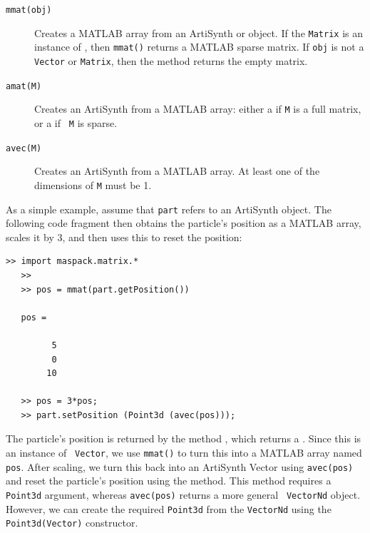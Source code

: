 \documentclass{article}
\begin{document}
\begin{description}

\item[{\tt mmat(obj)}]\mbox{}

Creates a MATLAB array from an ArtiSynth 
 or 
object. If the {\tt Matrix} is an instance of 
, then
{\tt mmat()} returns a MATLAB sparse matrix. If {\tt obj} is not a
{\tt Vector} or {\tt Matrix}, then the method returns the empty
matrix.

\item[{\tt amat(M)}]\mbox{}

Creates an ArtiSynth  from a MATLAB
array: either a  if {\tt M} is a
full matrix, or a  if {\tt
M} is sparse.

\item[{\tt avec(M)}]\mbox{}

Creates an ArtiSynth  from a
MATLAB array. At least one of the dimensions of {\tt M} must be 1.

\end{description}

As a simple example, assume that {\tt part} refers to an ArtiSynth
object. The following code fragment 
then obtains the particle's position as a MATLAB array,
scales it by 3, and then uses this to reset the position:
%
\begin{lstlisting}[]
   >> import maspack.matrix.*
   >> 
   >> pos = mmat(part.getPosition())

   pos =

         5
         0
        10

   >> pos = 3*pos;
   >> part.setPosition (Point3d (avec(pos)));
\end{lstlisting}
%
The particle's position is returned by the method 
,
which returns a . 
Since this is an instance of {\tt
Vector}, we use {\tt mmat()} to turn this into a MATLAB array named {\tt
pos}.  After scaling, we turn this back into an ArtiSynth Vector using
{\tt avec(pos)} and reset the particle's position using the
method. This method requires a {\tt Point3d}
argument, whereas {\tt avec(pos)} returns a more general {\tt
VectorNd} object. However, we can create the required
{\tt Point3d} from the {\tt VectorNd} using the {\tt Point3d(Vector)}
constructor.
\end{document}
